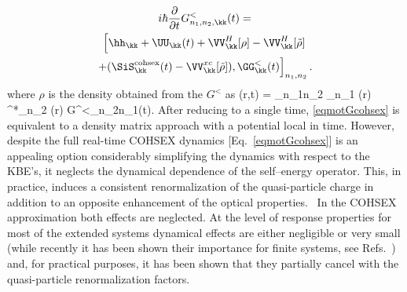 \begin{multline}
\label{eqmotGcohsex}
 i\hbar  \frac{\partial}{\partial t} G_{n_1,n_2,\kk}^<(t)=\\
 \left [ \hh_{\kk} + \UU_{\kk}(t) +  \VV_{\kk}^H[\rho] -
   \VV_{\kk}^H[\tilde \rho] \right .\\
   \left . + (\SiS_{\kk}^{\mathrm{cohsex}} (t)
   -\VV_{\kk}^{xc}[\tilde \rho]), \GG_{\kk}^<(t)\right ]_{n_1,n_2}.
\end{multline}
where $\rho$ is the density obtained from the $G^<$ as 
\be
\label{eqden}
\rho(\mathbf r,t) =  \sum_{n_1n_2\kk} \varphi_{n_1 \kk} (\mathbf r)  \varphi^*_{n_2 \kk}  (\mathbf r) G^<_{n_2n_1\kk}(t).
\ee
After reducing to a single time, \eqref{eqmotGcohsex} is equivalent to a density matrix approach with a potential local in time. 
%
However, despite the full real-time COHSEX dynamics [Eq.~\ref{eqmotGcohsex}] is an appealing
option considerably simplifying the dynamics with respect to the KBE's,
it neglects the dynamical dependence of the self--energy operator. This, in practice, induces a consistent renormalization 
of the quasi-particle charge\cite{PhysRevLett.45.290} in addition to an opposite enhancement of the optical properties.~\cite{PhysRevLett.91.176402}
In the COHSEX approximation both effects are neglected.
At the level of response properties for
most of the extended systems dynamical effects are either negligible or very small
(while recently it has been shown their importance for finite
systems, see Refs.~\cite{bsedynamic,PhysRevB.77.115118}) and, for practical  purposes, it has been shown that they  
partially cancel with the  quasi-particle renormalization factors.~\cite{PhysRevLett.91.176402} 

